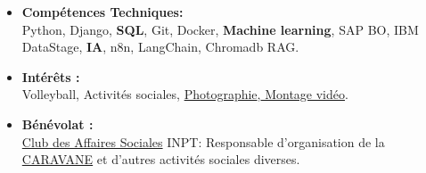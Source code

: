 

\begin{itemize}

\renewcommand{\labelitemi}{}


    \item \textbf{Compétences Techniques:} \\  Python, Django, \textbf{SQL}, Git, Docker, \textbf{Machine learning}, SAP BO, IBM DataStage, \textbf{IA}, n8n, LangChain, Chromadb
RAG.\\

    
\end{itemize}



\begin{itemize}

\renewcommand{\labelitemi}{}

    


    \item \textbf{Intérêts :} \\ Volleyball, Activités sociales, \href{https://drive.google.com/drive/folders/1WROwh4I3wSHb2ld4UxPFMFPSaQS6YNq8?usp=sharing}{Photographie},\href{https://drive.google.com/drive/folders/1zgEtg3bSQSdNhpenN_82eQdqTLTS8dTx?usp=sharing}{ Montage vidéo}.\\

    \item \textbf{Bénévolat :} \\ \href{https://www.instagram.com/casinpt/}{Club des Affaires Sociales} INPT: Responsable d'organisation de la \href{https://drive.google.com/file/d/1zqNgmlh-nzQ1dvB-RoG1z0RmY37vKgdt/view?usp=sharing}{CARAVANE} et d'autres activités sociales diverses.
    
\end{itemize}